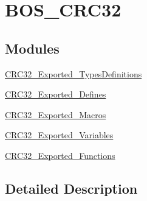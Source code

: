 \hypertarget{group___b_o_s___c_r_c32}{}\section{B\+O\+S\+\_\+\+C\+R\+C32}
\label{group___b_o_s___c_r_c32}
\subsection*{Modules}
\begin{DoxyCompactItemize}
\item 
\mbox{\hyperlink{group___c_r_c32___exported___types_definitions}{C\+R\+C32\+\_\+\+Exported\+\_\+\+Types\+Definitions}}
\item 
\mbox{\hyperlink{group___c_r_c32___exported___defines}{C\+R\+C32\+\_\+\+Exported\+\_\+\+Defines}}
\item 
\mbox{\hyperlink{group___c_r_c32___exported___macros}{C\+R\+C32\+\_\+\+Exported\+\_\+\+Macros}}
\item 
\mbox{\hyperlink{group___c_r_c32___exported___variables}{C\+R\+C32\+\_\+\+Exported\+\_\+\+Variables}}
\item 
\mbox{\hyperlink{group___c_r_c32___exported___functions}{C\+R\+C32\+\_\+\+Exported\+\_\+\+Functions}}
\end{DoxyCompactItemize}


\subsection{Detailed Description}
